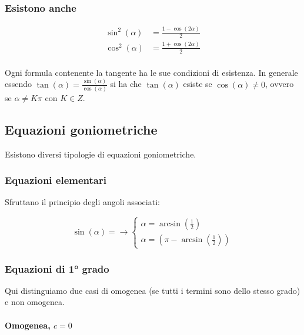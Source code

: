 \subsubsection*{Esistono anche}
\begin{align}
    \sin^2(\alpha) & = \frac{1-\cos(2\alpha)}{2}
    \label{eq:goniometria_formule_seno_al_quadrato}   \\
    \cos^2(\alpha) & = \frac{1+\cos(2\alpha)}{2}
    \label{eq:goniometria_formule_coseno_al_quadrato} \\
\end{align}

Ogni formula contenente la tangente ha le sue condizioni di esistenza.
In generale essendo $\tan(\alpha)=\frac{\sin(\alpha)}{\cos(\alpha)}$ si ha che $\tan(\alpha)$ esiste se $\cos(\alpha)\neq0$, ovvero se $\alpha\neq K\pi$ con $K \in Z$.


\subsection{Equazioni goniometriche}

Esistono diversi tipologie di equazioni goniometriche.

\subsubsection{Equazioni elementari}

Sfruttano il principio degli angoli associati:

\begin{equation*}
    \sin(\alpha)= \rightarrow
    \begin{cases}
        \alpha=\arcsin(\frac{1}{2}) \\
        \alpha=(\pi-\arcsin(\frac{1}{2}))
    \end{cases}
\end{equation*}

\subsubsection{Equazioni di 1° grado}

Qui distinguiamo due casi di omogenea (se tutti i termini sono dello stesso grado) e non omogenea.

\paragraph{Omogenea, $c = 0$}

